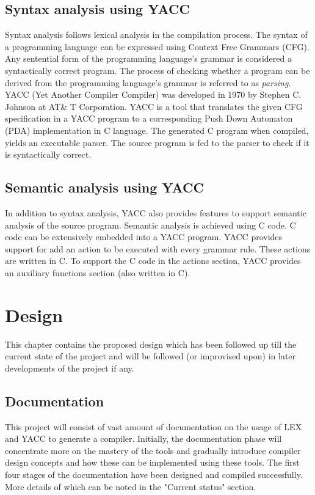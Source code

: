 \section{Syntax analysis using YACC}
Syntax analysis follows lexical analysis in the compilation process. The syntax of a programming language can be expressed using Context Free Grammars (CFG). Any sentential form of the programming language's grammar is considered a syntactically correct program. The process of checking whether a program can be derived from the programming language's grammar is referred to as \textit{parsing}. 
YACC (Yet Another Compiler Compiler) was developed in 1970 by Stephen C. Johnson at AT\& T  Corporation. YACC is a tool that translates the given CFG specification in a YACC program to a corresponding Push Down Automaton (PDA) implementation in C language. The generated C program when compiled, yields an executable parser. The source program is fed to the parser to check if it is syntactically correct.
 
\section{Semantic analysis using YACC}
In addition to syntax analysis, YACC also provides features to support semantic analysis of the source program. Semantic analysis is achieved using C code. C code can be extensively embedded into a YACC program. YACC provides support for add an action to be executed with every grammar rule. These actions are written in C. To support the C code in the actions section, YACC provides an auxiliary functions section (also written in C).

\chapter{Design}

This chapter contains the proposed design which has been followed up till the current state of the project and will be followed (or improvised upon) in later developments of the project if any.

\section{Documentation}

This project will consist of vast amount of documentation on the usage of LEX and YACC to generate a compiler. Initially, the documentation phase will concentrate more on the mastery of the tools and gradually introduce compiler design concepts and how these can be implemented using these tools. The first four stages of the documentation have been designed and compiled successfully. More details of which can be noted in the "Current status" section. 

